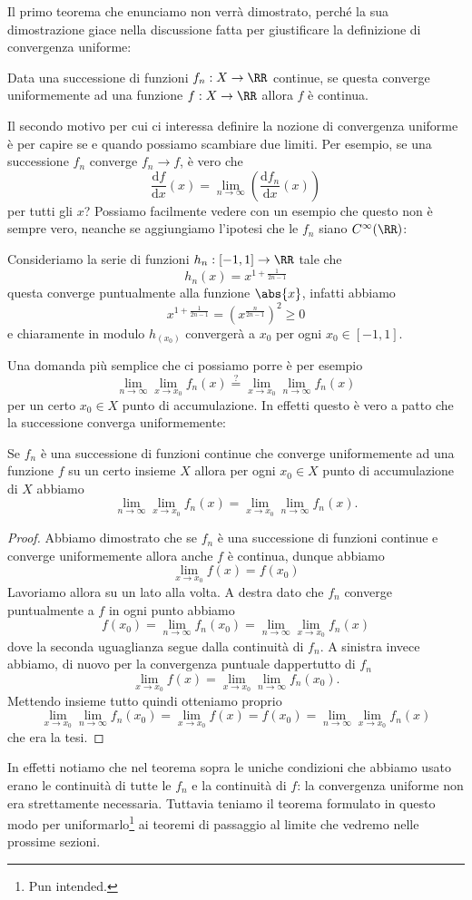 \documentclass[11pt]{scrartcl}
\newcommand{\dif}{\text{d}}
\begin{document}
	Il primo teorema che enunciamo non verrà dimostrato, perché la sua dimostrazione giace nella discussione fatta per giustificare la definizione di convergenza uniforme:
	\begin{theorem}
		Data una successione di funzioni $f_n:X\to\RR$ continue, se questa converge uniformemente ad una funzione $f:X\to\RR$ allora $f$ è continua. 
	\end{theorem} 
	Il secondo motivo per cui ci interessa definire la nozione di convergenza uniforme è per capire se e quando possiamo scambiare due limiti. Per esempio, se una successione $f_n$ converge $f_n\to f$, è vero che
	$$\frac{\dif f}{\dif x}(x)=\lim_{n\to\infty}\left(\frac{\dif f_n}{\dif x}(x)\right)$$ 
	per tutti gli $x$? Possiamo facilmente vedere con un esempio che questo non è sempre vero, neanche se aggiungiamo l'ipotesi che le $f_n$ siano $C^\infty(\RR)$:
	\begin{example}
		Consideriamo la serie di funzioni $h_n:[-1,1]\to\RR$ tale che 
		$$h_n(x)=x^{1+\frac{1}{2n-1}}$$
		questa converge puntualmente alla funzione $\abs{x}$, infatti abbiamo
		$$x^{1+\frac{1}{2n-1}}=\left(x^{\frac{n}{2n-1}}\right)^2\ge 0$$
		e chiaramente in modulo $h_(x_0)$ convergerà a $x_0$ per ogni $x_0\in [-1,1]$. 
	\end{example}
	Una domanda più semplice che ci possiamo porre è per esempio
	$$\lim_{n\to\infty}\lim_{x\to x_0}f_n(x)\overset{?}{=}\lim_{x\to x_0}\lim_{n\to\infty}f_n(x)$$
	per un certo $x_0\in X$ punto di accumulazione. In effetti questo è vero a patto che la successione converga uniformemente:
	\begin{proposition}
		Se $f_n$ è una successione di funzioni continue che converge uniformemente ad una funzione $f$ su un certo insieme $X$ allora per ogni $x_0\in X$ punto di accumulazione di $X$ abbiamo
		$$\lim_{n\to\infty}\lim_{x\to x_0}f_n(x)=\lim_{x\to x_0}\lim_{n\to\infty}f_n(x).$$
	\end{proposition}
	\begin{proof}
		Abbiamo dimostrato che se $f_n$ è una successione di funzioni continue e converge uniformemente allora anche $f$ è continua, dunque abbiamo
		$$\lim_{x\to x_0}f(x)=f(x_0)$$
		Lavoriamo allora su un lato alla volta. A destra dato che $f_n$ converge puntualmente a $f$ in ogni punto abbiamo
		$$f(x_0)=\lim_{n\to\infty}f_n(x_0)=\lim_{n\to\infty}\lim_{x\to x_0}f_n(x)$$
	 	dove la seconda uguaglianza segue dalla continuità di $f_n$. A sinistra invece abbiamo, di nuovo per la convergenza puntuale dappertutto di $f_n$
	 	$$\lim_{x\to x_0}f(x)=\lim_{x\to x_0}\lim_{n\to\infty}f_n(x_0).$$
	 	Mettendo insieme tutto quindi otteniamo proprio
	 	$$\lim_{x\to x_0}\lim_{n\to\infty}f_n(x_0)=\lim_{x\to x_0}f(x)=f(x_0)=\lim_{n\to\infty}\lim_{x\to x_0}f_n(x)$$
	 	che era la tesi.
	\end{proof}
	In effetti notiamo che nel teorema sopra le uniche condizioni che abbiamo usato erano le continuità di tutte le $f_n$ e la continuità di $f$: la convergenza uniforme non era strettamente necessaria. Tuttavia teniamo il teorema formulato in questo modo per uniformarlo\footnote{Pun intended.} ai teoremi di passaggio al limite che vedremo nelle prossime sezioni. 
\end{document}
